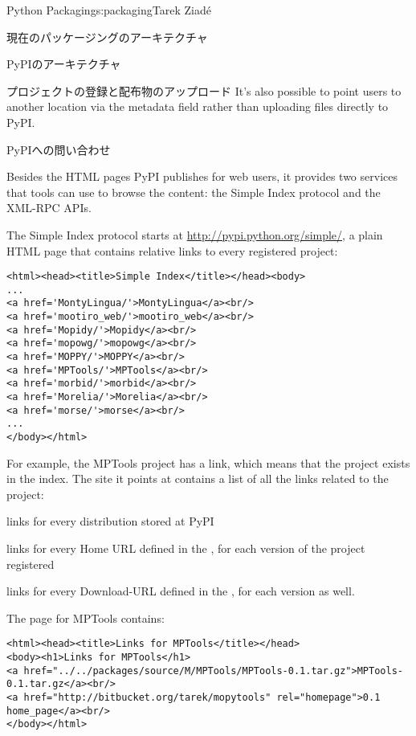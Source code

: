 \begin{aosachapter}{Python Packaging}{s:packaging}{Tarek Ziad\'{e}}
\begin{aosasect1}{現在のパッケージングのアーキテクチャ}
\begin{aosasect2}{PyPIのアーキテクチャ}
\begin{aosasect3}{プロジェクトの登録と配布物のアップロード}
It's also possible to point users to another location via the
 metadata field rather than uploading files directly to PyPI.

\end{aosasect3}

\begin{aosasect3}{PyPIへの問い合わせ}

Besides the HTML pages PyPI publishes for web users, it provides two
services that tools can use to browse the content: the Simple Index
protocol and the XML-RPC APIs.

The Simple Index protocol starts at
\url{http://pypi.python.org/simple/}, a plain HTML page that contains
relative links to every registered project:

\begin{verbatim}
<html><head><title>Simple Index</title></head><body>
...
<a href='MontyLingua/'>MontyLingua</a><br/>
<a href='mootiro_web/'>mootiro_web</a><br/>
<a href='Mopidy/'>Mopidy</a><br/>
<a href='mopowg/'>mopowg</a><br/>
<a href='MOPPY/'>MOPPY</a><br/>
<a href='MPTools/'>MPTools</a><br/>
<a href='morbid/'>morbid</a><br/>
<a href='Morelia/'>Morelia</a><br/>
<a href='morse/'>morse</a><br/>
...
</body></html>
\end{verbatim}

\noindent For example, the MPTools project has a  link, which
means that the project exists in the index.  The site it points at
contains a list of all the links related to the project:

\begin{aosaitemize}

  \item links for every distribution stored at PyPI

  \item links for every Home URL defined in the , for
  each version of the project registered

  \item links for every Download-URL defined in the , for
  each version as well.

\end{aosaitemize}

\noindent
The page for MPTools contains:

\begin{verbatim}
<html><head><title>Links for MPTools</title></head>
<body><h1>Links for MPTools</h1>
<a href="../../packages/source/M/MPTools/MPTools-0.1.tar.gz">MPTools-0.1.tar.gz</a><br/>
<a href="http://bitbucket.org/tarek/mopytools" rel="homepage">0.1 home_page</a><br/>
</body></html>
\end{verbatim}


\end{aosasect3}
\end{aosasect2}
\end{aosasect1}
\end{aosachapter}
